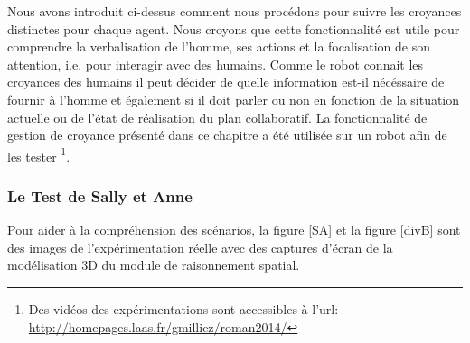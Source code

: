\documentclass[a4paper,11pt,twoside]{StyleThese}
\begin{document}
Nous avons introduit ci-dessus comment nous procédons pour suivre les croyances distinctes pour chaque agent. Nous croyons que cette fonctionnalité est utile pour comprendre la verbalisation de l'homme, ses actions et la focalisation de son attention, i.e. pour interagir avec des humains. Comme le robot connait les croyances des humains il peut décider de quelle information est-il nécéssaire de fournir à l'homme et également si il doit parler ou non en fonction de la situation actuelle ou de l'état de réalisation du plan collaboratif. La fonctionnalité de gestion de croyance présenté dans ce chapitre a été utilisée sur un robot afin de les tester \footnote{Des vidéos des expérimentations sont accessibles à l'url: \url{http://homepages.laas.fr/gmilliez/roman2014/}}.




\subsubsection{Le Test de Sally et Anne}

Pour aider à la compréhension des scénarios, la figure \ref{SA} et la figure  \ref{divB} sont des images de l'expérimentation réelle avec des captures d'écran de la modélisation 3D du module de raisonnement spatial.
\end{document}
